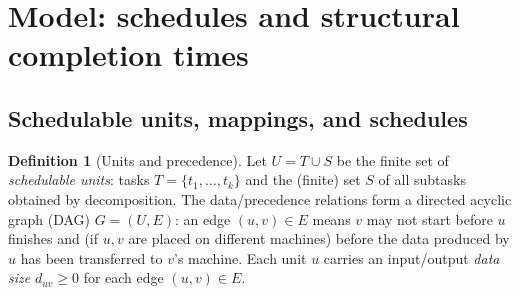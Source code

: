 \documentclass{amsart}
\theoremstyle{definition}
\newtheorem{definition}{Definition}
\begin{document}
\section{Model: schedules and structural completion times}\label{sec:model}

\subsection{Schedulable units, mappings, and schedules}

\begin{definition}[Units and precedence]\label{def:units}
Let $U=T\cup S$ be the finite set of \emph{schedulable units}: tasks
$T=\{t_1,\dots,t_k\}$ and the (finite) set $S$ of all subtasks obtained by
decomposition. The data/precedence relations form a directed acyclic graph
(DAG) $G=(U,E)$: an edge $(u,v)\in E$ means $v$ may not start before $u$
finishes and (if $u,v$ are placed on different machines) before the data
produced by $u$ has been transferred to $v$'s machine. Each unit $u$ carries an
input/output \emph{data size} $d_{uv}\ge0$ for each edge $(u,v)\in E$.
\end{definition}
\end{document}
